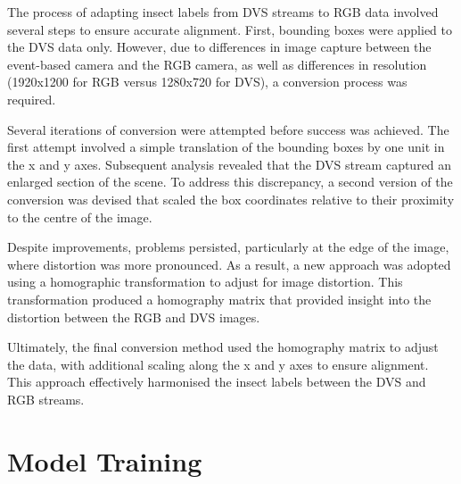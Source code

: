 The process of adapting insect labels from DVS streams to RGB data involved several steps to ensure accurate alignment. First, bounding boxes were applied to the DVS data only. However, due to differences in image capture between the event-based camera and the RGB camera, as well as differences in resolution (1920x1200 for RGB versus 1280x720 for DVS), a conversion process was required.

Several iterations of conversion were attempted before success was achieved. The first attempt involved a simple translation of the bounding boxes by one unit in the x and y axes. Subsequent analysis revealed that the DVS stream captured an enlarged section of the scene. To address this discrepancy, a second version of the conversion was devised that scaled the box coordinates relative to their proximity to the centre of the image.

Despite improvements, problems persisted, particularly at the edge of the image, where distortion was more pronounced. As a result, a new approach was adopted using a homographic transformation to adjust for image distortion. This transformation produced a homography matrix that provided insight into the distortion between the RGB and DVS images.

Ultimately, the final conversion method used the homography matrix to adjust the data, with additional scaling along the x and y axes to ensure alignment. This approach effectively harmonised the insect labels between the DVS and RGB streams.



\section{Model Training}

